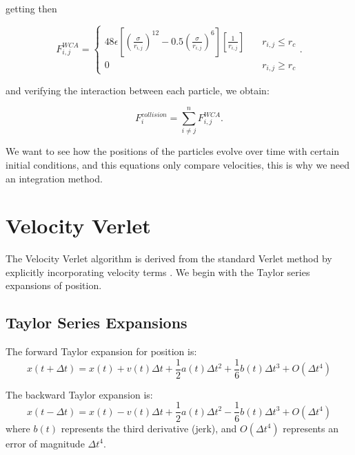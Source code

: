 getting then

\begin{equation}
  F_{i,j}^{WCA} = \begin{cases} 
    48\epsilon\left[ \left( \frac{\sigma}{r_{i,j}}\right)^{12} - 0.5\left( \frac{\sigma}{r_{i,j}}\right)^6\right]\left[ \frac{1}{r_{i,j}}\right] \quad &r_{i,j} \leq r_c \\
    0 \quad & r_{i,j} \geq r_c
  \end{cases}.
  \label{eq:wcaforce}
\end{equation}

and verifying the interaction between each particle, we obtain:

\begin{equation}
  F^{collision}_i = \sum^{n}_{i \neq j} F^{WCA}_{i,j}.  
  \label{eq:wcasum}
\end{equation}

We want to see how the positions of the particles evolve over time with certain initial conditions, and this equations only compare velocities, this is why we need an integration method.

\section{Velocity Verlet}

The Velocity Verlet algorithm is derived from the standard Verlet method by explicitly incorporating velocity terms \cite{verlet1967computer, chambliss2020magnetic}. We begin with the Taylor series expansions of position.

\subsection{Taylor Series Expansions}

The forward Taylor expansion for position is:
\begin{equation}
    x(t+\Delta t) = x(t) + v(t)\Delta t + \frac{1}{2}a(t)\Delta t^2 + \frac{1}{6}b(t)\Delta t^3 + O(\Delta t^4)
    \label{eq:taylor_forward}
\end{equation}

The backward Taylor expansion is:
\begin{equation}
    x(t-\Delta t) = x(t) - v(t)\Delta t + \frac{1}{2}a(t)\Delta t^2 - \frac{1}{6}b(t)\Delta t^3 + O(\Delta t^4)
    \label{eq:taylor_backward}
\end{equation}
where $b(t)$ represents the third derivative (jerk), and $O(\Delta t^4)$ represents an error of magnitude $\Delta t^4$.

